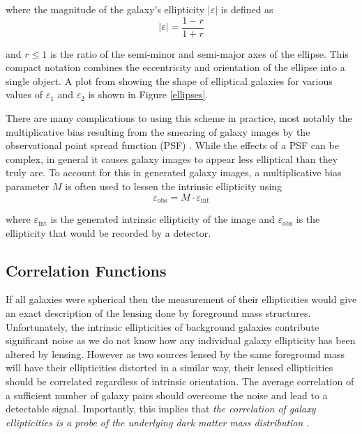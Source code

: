 \documentclass[%
 reprint,
 amsmath,amssymb,
 aps,nofootinbib
]{revtex4-1}
\begin{document}
\noindent where the magnitude of the galaxy's ellipticity $|\varepsilon|$ is defined as
\begin{equation}
|\varepsilon|=\frac{1-r}{1+r}
\end{equation}

\noindent and $r\leq1$ is the ratio of the semi-minor and semi-major axes of the ellipse. This compact notation combines the eccentricity and orientation of the ellipse into a single object. A plot from \cite{schneider} showing the shape of elliptical galaxies for various values of $\varepsilon_1$ and $\varepsilon_2$ is shown in Figure \ref{ellipses}.

There are many complications to using this scheme in practice, most notably the multiplicative bias resulting from the smearing of galaxy images by the observational point spread function (PSF) \cite{multiplicative_bias}. While the effects of a PSF can be complex, in general it causes galaxy images to appear less elliptical than they truly are. To account for this in generated galaxy images, a multiplicative bias parameter $M$ is often used to lessen the intrinsic ellipticity using
\begin{equation}\label{mult_bias}
\varepsilon_{\text{obs}}=M\cdot\varepsilon_{\text{int}}
\end{equation}

\noindent where $\varepsilon_{\text{int}}$ is the generated intrinsic ellipticity of the image and $\varepsilon_{\text{obs}}$ is the ellipticity that would be recorded by a detector.


\subsection{Correlation Functions} \label{corr_functions}

If all galaxies were spherical then the measurement of their ellipticities would give an exact description of the lensing done by foreground mass structures. Unfortunately, the intrinsic ellipticities of background galaxies contribute significant noise as we do not know how any individual galaxy ellipticity has been altered by lensing. However as two sources lensed by the same foreground mass will have their ellipticities distorted in a similar way, their lensed ellipticities should be correlated regardless of intrinsic orientation. The average correlation of a sufficient number of galaxy pairs should overcome the noise and lead to a detectable signal. Importantly, this implies that \textit{the correlation of galaxy ellipticities is a probe of the underlying dark matter mass distribution} \cite{dark_matter_probe}.
\end{document}
